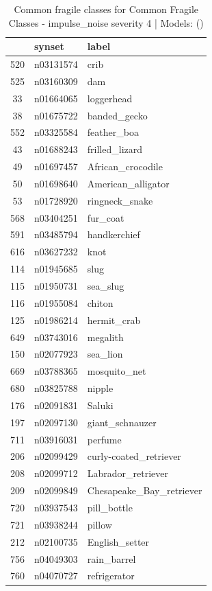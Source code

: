 \begin{table}
\caption{Common fragile classes for Common Fragile Classes - impulse_noise severity 4 | Models: ()}
\label{tab:Common Fragile Classes - impulse_noise severity 4_d41d8cd9}
\begin{tabular}{cll}
\toprule
 & synset & label \\
\midrule
520 & n03131574 & crib \\
525 & n03160309 & dam \\
33 & n01664065 & loggerhead \\
38 & n01675722 & banded_gecko \\
552 & n03325584 & feather_boa \\
43 & n01688243 & frilled_lizard \\
49 & n01697457 & African_crocodile \\
50 & n01698640 & American_alligator \\
53 & n01728920 & ringneck_snake \\
568 & n03404251 & fur_coat \\
591 & n03485794 & handkerchief \\
616 & n03627232 & knot \\
114 & n01945685 & slug \\
115 & n01950731 & sea_slug \\
116 & n01955084 & chiton \\
125 & n01986214 & hermit_crab \\
649 & n03743016 & megalith \\
150 & n02077923 & sea_lion \\
669 & n03788365 & mosquito_net \\
680 & n03825788 & nipple \\
176 & n02091831 & Saluki \\
197 & n02097130 & giant_schnauzer \\
711 & n03916031 & perfume \\
206 & n02099429 & curly-coated_retriever \\
208 & n02099712 & Labrador_retriever \\
209 & n02099849 & Chesapeake_Bay_retriever \\
720 & n03937543 & pill_bottle \\
721 & n03938244 & pillow \\
212 & n02100735 & English_setter \\
756 & n04049303 & rain_barrel \\
760 & n04070727 & refrigerator \\

\end{tabular}
\end{table}
